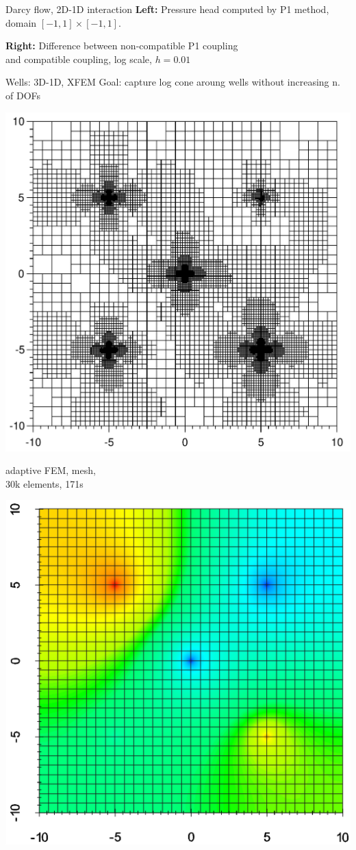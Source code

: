 \documentclass[10pt]{beamer} %
\begin{document}
\begin{frame}{Darcy flow, 2D-1D interaction}
 {\bf Left: } Pressure head computed by P1 method,\\
              domain $[-1,1] \times [-1,1]$.
 
 {\bf Right: } Difference between non-compatible P1 coupling \\
 and compatible coupling, log scale, $h=0.01$

\end{frame}

\begin{frame}{Wells: 3D-1D, XFEM}
    Goal: capture log cone aroung wells without increasing n. of DOFs
     \vspace{2ex}
     \begin{minipage}{0.4\linewidth}
         \centering
         \includegraphics[width=0.8\linewidth]{graphics/five_wells_mesh1.pdf}
         
         \centering
         {\footnotesize adaptive FEM, mesh,\\ 30k elements, 171s}
     \end{minipage}
     \hspace{3em}
     \begin{minipage}{0.4\linewidth}
         \centering
         \includegraphics[width=0.8\linewidth]{graphics/five_wells_mesh2.pdf}
         

\end{minipage}
\end{frame}
\end{document}
